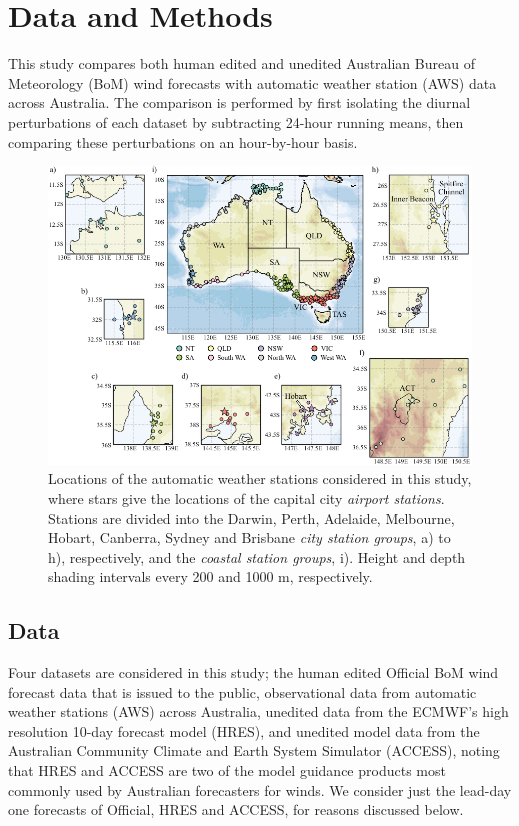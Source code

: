 \documentclass[twocol]{ametsoc}
\begin{document}
\section{Data and Methods} \label{Sec:Methods}
This study compares both human edited and unedited Australian Bureau of Meteorology (BoM) wind forecasts with automatic weather station (AWS) data across Australia. The comparison is performed by first isolating the diurnal perturbations of each dataset by subtracting 24-hour running means, then comparing these perturbations on an hour-by-hour basis.

\begin{figure}
\centering
\includegraphics[width=39pc]{map.pdf}
\caption{Locations of the automatic weather stations considered in this study, where stars give the locations of the capital city \textit{airport stations}. Stations are divided into the Darwin, Perth, Adelaide, Melbourne, Hobart, Canberra, Sydney and Brisbane \textit{city station groups}, a) to h), respectively, and the \textit{coastal station groups}, i).  Height and depth shading intervals every 200 and 1000 m, respectively.}
\label{Fig:map}
\end{figure}

\subsection{Data}
Four datasets are considered in this study; the human edited Official BoM wind forecast data that is issued to the public, observational data from automatic weather stations (AWS) across Australia, unedited data from the ECMWF's high resolution 10-day forecast model (HRES), and unedited model data from the Australian Community Climate and Earth System Simulator (ACCESS), noting that HRES and ACCESS are two of the model guidance products most commonly used by Australian forecasters for winds. We consider just the lead-day one forecasts of Official, HRES and ACCESS, for reasons discussed below. 
\end{document}
